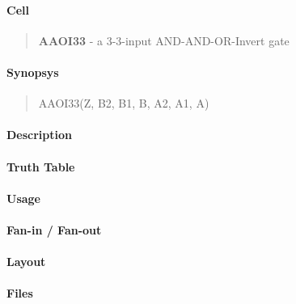 \label{AAOI33}
\paragraph{Cell}
\begin{quote}
    \textbf{AAOI33} - a 3-3-input AND-AND-OR-Invert gate
\end{quote}

\paragraph{Synopsys}
\begin{quote}
    AAOI33(Z, B2, B1, B, A2, A1, A)
\end{quote}

\paragraph{Description}



\paragraph{Truth Table}


\paragraph{Usage}

\paragraph{Fan-in / Fan-out}

\paragraph{Layout}

\paragraph{Files}

